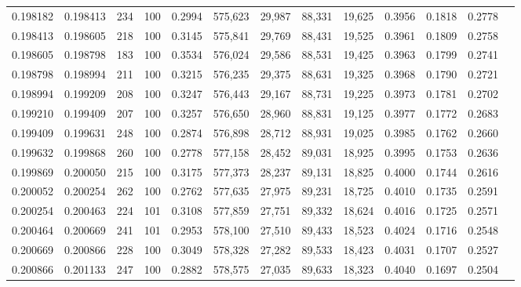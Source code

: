 \begin{tabular}{rrrrrrrrrrrrr}
0.198182 & 0.198413 &   234 & 100 &                                     0.2994 & 575,623 &  29,987 &  88,331 &  19,625 & 0.3956 & 0.1818 & 0.2778 \\
0.198413 & 0.198605 &   218 & 100 &                                     0.3145 & 575,841 &  29,769 &  88,431 &  19,525 & 0.3961 & 0.1809 & 0.2758 \\
0.198605 & 0.198798 &   183 & 100 &                                     0.3534 & 576,024 &  29,586 &  88,531 &  19,425 & 0.3963 & 0.1799 & 0.2741 \\
0.198798 & 0.198994 &   211 & 100 &                                     0.3215 & 576,235 &  29,375 &  88,631 &  19,325 & 0.3968 & 0.1790 & 0.2721 \\
0.198994 & 0.199209 &   208 & 100 &                                     0.3247 & 576,443 &  29,167 &  88,731 &  19,225 & 0.3973 & 0.1781 & 0.2702 \\
0.199210 & 0.199409 &   207 & 100 &                                     0.3257 & 576,650 &  28,960 &  88,831 &  19,125 & 0.3977 & 0.1772 & 0.2683 \\
0.199409 & 0.199631 &   248 & 100 &                                     0.2874 & 576,898 &  28,712 &  88,931 &  19,025 & 0.3985 & 0.1762 & 0.2660 \\
0.199632 & 0.199868 &   260 & 100 &                                     0.2778 & 577,158 &  28,452 &  89,031 &  18,925 & 0.3995 & 0.1753 & 0.2636 \\
0.199869 & 0.200050 &   215 & 100 &                                     0.3175 & 577,373 &  28,237 &  89,131 &  18,825 & 0.4000 & 0.1744 & 0.2616 \\
0.200052 & 0.200254 &   262 & 100 &                                     0.2762 & 577,635 &  27,975 &  89,231 &  18,725 & 0.4010 & 0.1735 & 0.2591 \\
0.200254 & 0.200463 &   224 & 101 &                                     0.3108 & 577,859 &  27,751 &  89,332 &  18,624 & 0.4016 & 0.1725 & 0.2571 \\
0.200464 & 0.200669 &   241 & 101 &                                     0.2953 & 578,100 &  27,510 &  89,433 &  18,523 & 0.4024 & 0.1716 & 0.2548 \\
0.200669 & 0.200866 &   228 & 100 &                                     0.3049 & 578,328 &  27,282 &  89,533 &  18,423 & 0.4031 & 0.1707 & 0.2527 \\
0.200866 & 0.201133 &   247 & 100 &                                     0.2882 & 578,575 &  27,035 &  89,633 &  18,323 & 0.4040 & 0.1697 & 0.2504 \\

\end{tabular}
